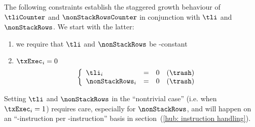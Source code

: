 The following constraints establish the staggered growth behaviour of
$\tliCounter$ and $\nonStackRowsCounter$
in conjunction with
$\tli$ and $\nonStackRows$.
We start with the latter:
\begin{enumerate}
	\item we require that $\tli$ and $\nonStackRows$ be \hubStamp-constant
	\item \If $\txExec _{i} = 0$ \Then
		\[
			\left\{ \begin{array}{lclr}
				\tli                 _{i} & = & 0 & (\trash) \\
				\nonStackRows        _{i} & = & 0 & (\trash) \\
			\end{array} \right.
		\]
\end{enumerate}
Setting
$\tli$ and $\nonStackRows$
in the ``nontrivial case'' (i.e. when $\txExec _{i} = 1$)
requires care, especially for $\nonStackRows$,
and will happen on an ``\evm{}-instruction per \evm{}-instruction'' basis
in section~(\ref{hub: instruction handling}).

